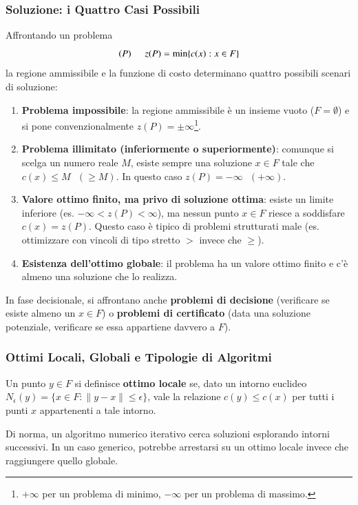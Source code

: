 \documentclass[12pt]{extarticle} %
\begin{document}
\subsubsection{Soluzione: i Quattro Casi Possibili}
Affrontando un problema $$(P)\hspace{0.5cm}z(P)=\min\{c(x):x\in F\}$$la regione ammissibile e la funzione di costo determinano quattro possibili scenari di soluzione:
\begin{enumerate}
    \item \textbf{Problema impossibile}: la regione ammissibile è un insieme vuoto ($F = \emptyset$) e si pone convenzionalmente $z(P) = \pm\infty$\footnote{$+\infty$ per un problema di minimo, $-\infty$ per un problema di massimo.}.
    \item \textbf{Problema illimitato (inferiormente o superiormente)}: comunque si scelga un numero reale $M$, esiste sempre una soluzione $x \in F$ tale che $c(x) \le M\textit{ }(\ge M)$. In questo caso $z(P) = -\infty\textit{ }(+\infty)$.
    \item \textbf{Valore ottimo finito, ma privo di soluzione ottima}: esiste un limite inferiore (es. $-\infty < z(P) < \infty$), ma nessun punto $x \in F$ riesce a soddisfare $c(x) = z(P)$. Questo caso è tipico di problemi strutturati male (es. ottimizzare con vincoli di tipo stretto $>$ invece che $\ge$).
    \item \textbf{Esistenza dell'ottimo globale}: il problema ha un valore ottimo finito e c'è almeno una soluzione che lo realizza.
\end{enumerate}
In fase decisionale, si affrontano anche \textbf{problemi di decisione} (verificare se esiste almeno un $x \in F$) o \textbf{problemi di certificato} (data una soluzione potenziale, verificare se essa appartiene davvero a $F$).

\subsubsection{Ottimi Locali, Globali e Tipologie di Algoritmi}
Un punto $y \in F$ si definisce \textbf{ottimo locale} se, dato un intorno euclideo $N_{\epsilon}(y) = \{x \in F : \|y - x\| \le \epsilon \}$, vale la relazione $c(y) \le c(x)$ per tutti i punti $x$ appartenenti a tale intorno.

Di norma, un algoritmo numerico iterativo cerca soluzioni esplorando intorni successivi. In un caso generico, potrebbe arrestarsi su un ottimo locale invece che raggiungere quello globale. 
\end{document}
